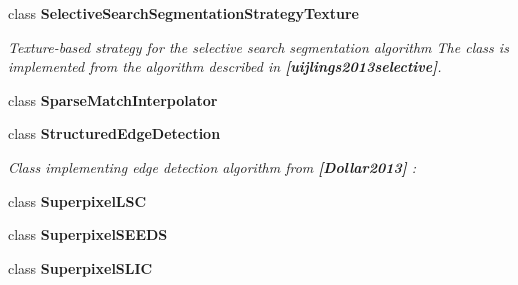\begin{DoxyCompactItemize}
class {\bfseries Selective\+Search\+Segmentation\+Strategy\+Texture}
\begin{DoxyCompactList}\small\item\em Texture-\/based strategy for the selective search segmentation algorithm The class is implemented from the algorithm described in {\bfseries [uijlings2013selective]}. \end{DoxyCompactList}\item 
class {\bfseries Sparse\+Match\+Interpolator}
\item 
class {\bfseries Structured\+Edge\+Detection}
\begin{DoxyCompactList}\small\item\em Class implementing edge detection algorithm from {\bfseries [Dollar2013]} \+: \end{DoxyCompactList}\item 
class {\bfseries Superpixel\+L\+SC}
\item 
class {\bfseries Superpixel\+S\+E\+E\+DS}
\item 
class {\bfseries Superpixel\+S\+L\+IC}
\end{DoxyCompactItemize}
